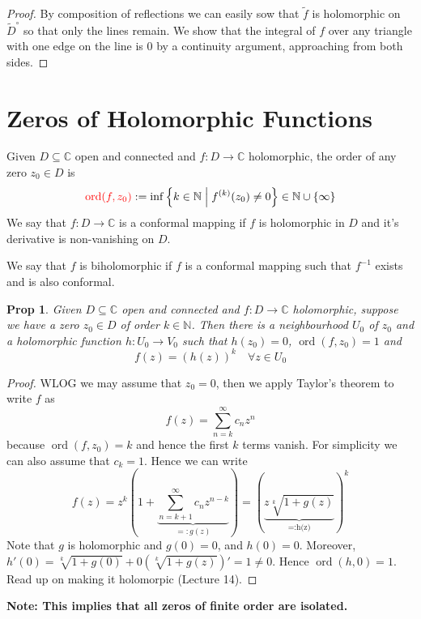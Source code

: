 \documentclass[11pt]{article}
\newcommand{\defeq}{:=}
\newcommand{\eqdef}{=:}
\DeclareMathOperator{\ord}{\text{ord}}
\newcommand{\relmiddle}[1]{\mathrel{}\middle#1\mathrel{}}
\newcommand{\rmv}{\relmiddle|}
\newcommand{\C}{\mathbb{C}}
\newcommand{\N}{\mathbb{N}}
\newenvironment{defin}
	{\begin{mdframed}[backgroundcolor=white, roundcorner=5pt, linewidth=1pt]}
	{\end{mdframed}}
\newcommand{\mdf}[1]{{\color{red} #1}}
\newenvironment{note}
	{\begin{mdframed}[backgroundcolor=white, linecolor=red, roundcorner=5pt, linewidth=1pt]\bfseries{Note:}\normalfont}
	{\end{mdframed}}
\newtheorem{prop}[theorem]{Prop}
\begin{document}
\begin{proof}
By composition of reflections we can easily sow that $\widetilde{f}$ is holomorphic on $\widetilde{D}^\circ$ so that only the lines remain.
We show that the integral of $f$ over any triangle with one edge on the line is $0$ by a continuity argument, approaching from both sides.
\end{proof}

\section{Zeros of Holomorphic Functions}
\begin{defin}
	Given $D\subseteq\C$ open and connected and $f:D\to\C$ holomorphic, the \mdf{order} of any zero $z_0\in D$ is
	\[
		\mdf{\ord(f,z_0)}\defeq\inf\left\{k\in\N \rmv f^{(k)}(z_0)\neq 0\right\}\in\N\cup\left\{\infty\right\}
	\]
	We say that $f:D\to\C$ is a \mdf{conformal mapping} if $f$ is holomorphic in $D$ and it's derivative is non-vanishing on $D$.

	We say that $f$ is \mdf{biholomorphic} if $f$ is a conformal mapping such that $f^{-1}$ exists and is also conformal.
\end{defin}

\begin{prop}
Given $D\subseteq \C$ open and connected and $f:D\to\C$ holomorphic, suppose we have a zero $z_0\in D$ of order $k\in\N$.
Then there is a neighbourhood $U_0$ of $z_0$ and a holomorphic function $h:U_0\to V_0$ such that $h(z_0)=0$, $\ord(f,z_0)=1$ and
\[
	f(z)=(h(z))^k\quad\forall z\in U_0
\]
\end{prop}

\begin{proof}
WLOG we may assume that $z_0=0$, then we apply Taylor's theorem to write $f$ as
\[
	f(z)=\sum_{n=k}^{\infty}c_nz^n
\]
because $\ord(f,z_0)=k$ and hence the first $k$ terms vanish.
For simplicity we can also assume that $c_k=1$.
Hence we can write
\[
	f(z)=z^k\left(1+\underbrace{\sum_{n=k+1}^{\infty}c_nz^{n-k}}_{\eqdef g(z)}\right)=\left(\underbrace{z\sqrt[k]{1+ g(z)}}_{\text{\eqdef h(z)}}\right)^k
\]
Note that $g$ is holomorphic and $g(0)=0$, and $h(0)=0$.
Moreover, $h'(0)=\sqrt[k]{1+g(0)}+0\left(\sqrt[k]{1+g(z)}\right)' = 1 \neq 0$.
Hence $\ord(h, 0)=1$.
Read up on making it holomorpic (Lecture 14).
\end{proof}

\begin{note}
	This implies that all zeros of finite order are isolated.
\end{note}
\end{document}
